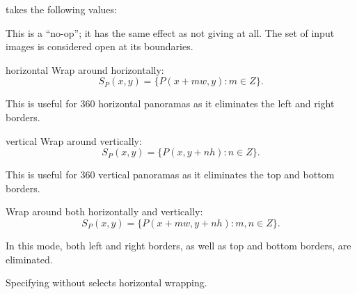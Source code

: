 \begin{codelist}

   takes the following values:

  \begin{codelist}
  \item[\itempar{none \\ open}]\itemend This is a ``no-op''; it has
    the same effect as not giving  at all.  The set of
    input images is considered open at its boundaries.

  \item[horizontal]\itemend
    Wrap around horizontally:
    \[
    S_P(x, y) = \{P(x + m w, y): m \in Z\}.
    \]

    This is useful for 360\angulardegree{}%
    horizontal panoramas as it eliminates the left and right borders.

  \item[vertical]\itemend Wrap around vertically:
    \[
    S_P(x, y) = \{P(x, y + n h): n \in Z\}.
    \]

    This is useful for 360\angulardegree{}%
    vertical panoramas as it eliminates the top and bottom borders.

  \item[\itempar{both \\ horizontal+vertical
      \\ vertical+horizontal}]\itemend Wrap around both horizontally
    and vertically:
    \[
    S_P(x, y) = \{P(x + m w, y + n h): m, n \in Z\}.
    \]

    In this mode, both left and right borders, as well as top and
    bottom borders, are eliminated.
  \end{codelist}

  Specifying  without  selects horizontal
  wrapping.
\end{codelist}

